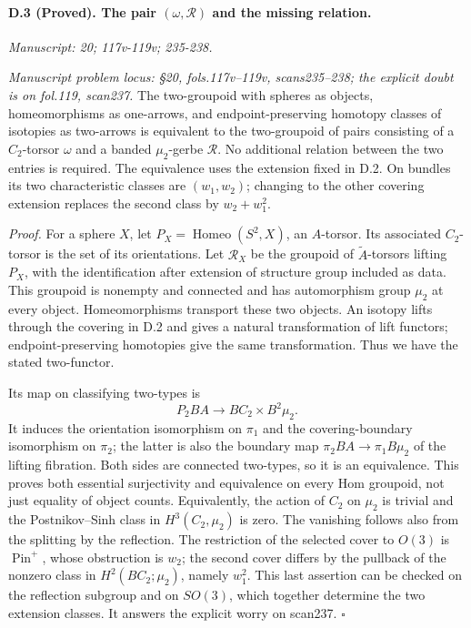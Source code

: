 \paragraph{D.3 (Proved). The pair $(\omega,\mathcal R)$ and the missing relation.}
\textit{Manuscript: 20; 117v-119v; 235-238.}

\emph{Manuscript problem locus: \S20, fols.117v--119v, scans235--238; the explicit doubt is on fol.119, scan237.}
The two-groupoid with spheres as objects, homeomorphisms as one-arrows, and endpoint-preserving homotopy classes of isotopies as two-arrows is equivalent to the two-groupoid of pairs consisting of a $C_2$-torsor $\omega$ and a banded $\mu_2$-gerbe $\mathcal R$. No additional relation between the two entries is required. The equivalence uses the extension fixed in D.2. On bundles its two characteristic classes are $(w_1,w_2)$; changing to the other covering extension replaces the second class by $w_2+w_1^2$.

\emph{Proof.} For a sphere $X$, let $P_X=\operatorname{Homeo}(S^2,X)$, an $A$-torsor. Its associated $C_2$-torsor is the set of its orientations. Let $\mathcal R_X$ be the groupoid of $\widetilde A$-torsors lifting $P_X$, with the identification after extension of structure group included as data. This groupoid is nonempty and connected and has automorphism group $\mu_2$ at every object. Homeomorphisms transport these two objects. An isotopy lifts through the covering in D.2 and gives a natural transformation of lift functors; endpoint-preserving homotopies give the same transformation. Thus we have the stated two-functor.

Its map on classifying two-types is
\[
P_2BA\longrightarrow BC_2\times B^2\mu_2.
\]
It induces the orientation isomorphism on $\pi_1$ and the covering-boundary isomorphism on $\pi_2$; the latter is also the boundary map $\pi_2BA\to\pi_1B\mu_2$ of the lifting fibration. Both sides are connected two-types, so it is an equivalence. This proves both essential surjectivity and equivalence on every Hom groupoid, not just equality of object counts. Equivalently, the action of $C_2$ on $\mu_2$ is trivial and the Postnikov--Sinh class in $H^3(C_2,\mu_2)$ is zero. The vanishing follows also from the splitting by the reflection. The restriction of the selected cover to $O(3)$ is $\operatorname{Pin}^+$, whose obstruction is $w_2$; the second cover differs by the pullback of the nonzero class in $H^2(BC_2;\mu_2)$, namely $w_1^2$. This last assertion can be checked on the reflection subgroup and on $SO(3)$, which together determine the two extension classes. It answers the explicit worry on scan237. \hfill$\square$

